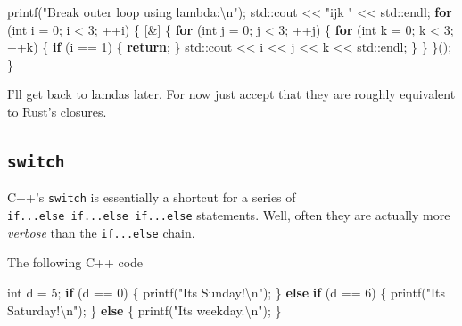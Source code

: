 \documentclass[
]{book}
\newenvironment{Shaded}{\begin{snugshade}}{\end{snugshade}}
\newcommand{\BuiltInTok}[1]{#1}
\newcommand{\ControlFlowTok}[1]{\textcolor[rgb]{0.13,0.29,0.53}{\textbf{#1}}}
\newcommand{\DataTypeTok}[1]{\textcolor[rgb]{0.13,0.29,0.53}{#1}}
\newcommand{\DecValTok}[1]{\textcolor[rgb]{0.00,0.00,0.81}{#1}}
\newcommand{\NormalTok}[1]{#1}
\newcommand{\SpecialCharTok}[1]{\textcolor[rgb]{0.00,0.00,0.00}{#1}}
\newcommand{\StringTok}[1]{\textcolor[rgb]{0.31,0.60,0.02}{#1}}
\begin{document}
\begin{Shaded}
\begin{Highlighting}[]
\NormalTok{printf(}\StringTok{"Break outer loop using lambda:}\SpecialCharTok{\textbackslash{}n}\StringTok{"}\NormalTok{);}
\BuiltInTok{std::}\NormalTok{cout \textless{}\textless{} }\StringTok{"ijk "}\NormalTok{ \textless{}\textless{} }\BuiltInTok{std::}\NormalTok{endl;}
\ControlFlowTok{for}\NormalTok{ (}\DataTypeTok{int}\NormalTok{ i = }\DecValTok{0}\NormalTok{; i \textless{} }\DecValTok{3}\NormalTok{; ++i)}
\NormalTok{\{}
\NormalTok{    [\&] \{}
        \ControlFlowTok{for}\NormalTok{ (}\DataTypeTok{int}\NormalTok{ j = }\DecValTok{0}\NormalTok{; j \textless{} }\DecValTok{3}\NormalTok{; ++j)}
\NormalTok{        \{}
            \ControlFlowTok{for}\NormalTok{ (}\DataTypeTok{int}\NormalTok{ k = }\DecValTok{0}\NormalTok{; k \textless{} }\DecValTok{3}\NormalTok{; ++k)}
\NormalTok{            \{}
                \ControlFlowTok{if}\NormalTok{ (i == }\DecValTok{1}\NormalTok{)}
\NormalTok{                \{}
                    \ControlFlowTok{return}\NormalTok{;}
\NormalTok{                \}}
                \BuiltInTok{std::}\NormalTok{cout \textless{}\textless{} i \textless{}\textless{} j \textless{}\textless{} k \textless{}\textless{} }\BuiltInTok{std::}\NormalTok{endl;}
\NormalTok{            \}}
\NormalTok{        \}}
\NormalTok{    \}();}
\NormalTok{\}}
\end{Highlighting}
\end{Shaded}

I'll get back to lamdas later. For now just accept that they are roughly equivalent to Rust's closures.

\hypertarget{switch}{%
\subsection{\texorpdfstring{\texttt{switch}}{switch}}\label{switch}}

C++'s \texttt{switch} is essentially a shortcut for a series of \texttt{if...else\ if...else\ if...else} statements. Well, often they are actually more \emph{verbose} than the \texttt{if...else} chain.

The following C++ code

\begin{Shaded}
\begin{Highlighting}[]
\DataTypeTok{int}\NormalTok{ d = }\DecValTok{5}\NormalTok{;}
\ControlFlowTok{if}\NormalTok{ (d == }\DecValTok{0}\NormalTok{) \{}
\NormalTok{    printf(}\StringTok{"It\textquotesingle{}s Sunday!}\SpecialCharTok{\textbackslash{}n}\StringTok{"}\NormalTok{);}
\NormalTok{\} }\ControlFlowTok{else} \ControlFlowTok{if}\NormalTok{ (d == }\DecValTok{6}\NormalTok{) \{}
\NormalTok{    printf(}\StringTok{"It\textquotesingle{}s Saturday!}\SpecialCharTok{\textbackslash{}n}\StringTok{"}\NormalTok{);}
\NormalTok{\} }\ControlFlowTok{else}\NormalTok{ \{}
\NormalTok{    printf(}\StringTok{"It\textquotesingle{}s weekday.}\SpecialCharTok{\textbackslash{}n}\StringTok{"}\NormalTok{);}
\NormalTok{\}}
\end{Highlighting}
\end{Shaded}
\end{document}
